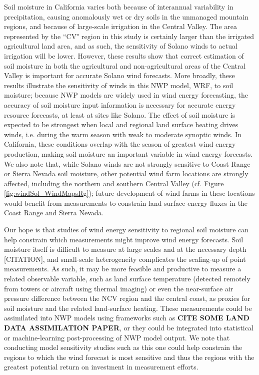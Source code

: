 Soil moisture in California varies both because of interannual variability in precipitation, causing anomalously wet or dry soils in the unmanaged mountain regions, and because of large-scale irrigation in the Central Valley.  The area represented by the ``CV" region in this study is certainly larger than the irrigated agricultural land area, and as such, the sensitivity of Solano winds to actual irrigation will be lower.  However, these results show that correct estimation of soil moisture in both the agricultural and non-agricultural areas of the Central Valley is important for accurate Solano wind forecasts.  More broadly, these results illustrate the sensitivity of winds in this NWP model, WRF, to soil moisture; because NWP models are widely used in wind energy forecasting, the accuracy of soil moisture input information is necessary for accurate energy resource forecasts, at least at sites like Solano.  The effect of soil moisture is expected to be strongest when local and regional land surface heating drives winds, i.e. during the warm season with weak to moderate synoptic winds.  In California, these conditions overlap with the season of greatest wind energy production, making soil moisture an important variable in wind energy forecasts.  We also note that, while Solano winds are not strongly sensitive to Coast Range or Sierra Nevada soil moisture, other potential wind farm locations are strongly affected, including the northern and southern Central Valley (cf. Figure \ref{fig:windSol_WindMapsRg}); future development of wind farms in these locations would benefit from measurements to constrain land surface energy fluxes in the Coast Range and Sierra Nevada.

Our hope is that studies of wind energy sensitivity to regional soil moisture can help constrain which measurements might improve wind energy forecasts.  Soil moisture itself is difficult to measure at large scales and at the necessary depth [CITATION], and small-scale heterogeneity complicates the scaling-up of point measurements.  As such, it may be more feasible and productive to measure a related observable variable, such as land surface temperature (detected remotely from towers or aircraft using thermal imaging) or even the near-surface air pressure difference between the NCV region and the central coast, as proxies for soil moisture and the related land-surface heating.  These measurements could be assimilated into NWP models using frameworks such as \textbf{CITE SOME LAND DATA ASSIMILATION PAPER}, or they could be integrated into statistical or machine-learning post-processing of NWP model output.  We note that conducting model sensitivity studies such as this one could help constrain the regions to which the wind forecast is most sensitive and thus the regions with the greatest potential return on investment in measurement efforts.

